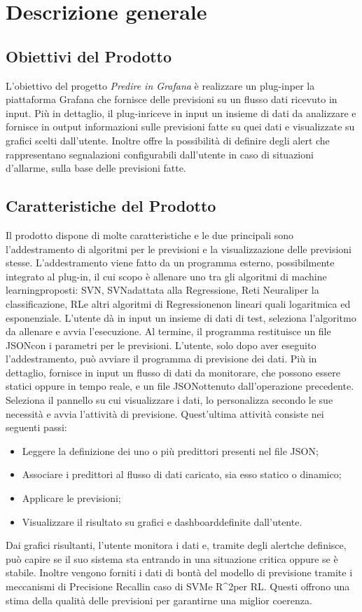 \section{Descrizione generale}
	\subsection{Obiettivi del Prodotto}
	L'obiettivo del progetto \textit{Predire in Grafana} è realizzare un plug-in\glosp per la piattaforma Grafana che fornisce delle previsioni su un flusso dati ricevuto in input.
	Più in dettaglio, il plug-in\glosp riceve in input un insieme di dati da analizzare e fornisce in output informazioni sulle previsioni fatte su quei dati e visualizzate su grafici scelti dall'utente. Inoltre offre la possibilità di definire degli alert che rappresentano segnalazioni configurabili dall'utente in caso di situazioni d'allarme, sulla base delle previsioni fatte. 
	\subsection{Caratteristiche del Prodotto}
	Il prodotto dispone di molte caratteristiche e le due principali sono l'addestramento di algoritmi per le previsioni e la visualizzazione delle previsioni stesse.
	L'addestramento viene fatto da un programma esterno, possibilmente integrato al plug-in\glo, il cui scopo è allenare uno tra gli algoritmi di machine learning\glosp proposti: SVN\glosp, SVN\glosp adattata alla Regressione\glo, Reti Neurali\glosp per la classificazione, RL\glo e altri algoritmi di Regressione\glosp non lineari quali logaritmica ed esponenziale. L'utente dà in input un insieme di dati di test, seleziona l'algoritmo da allenare e avvia l'esecuzione. Al termine, il programma restituisce un file JSON\glosp con i parametri per le previsioni.
	L'utente, solo dopo aver eseguito l'addestramento, può avviare il programma di previsione dei dati. Più in dettaglio, fornisce in input un flusso di dati da monitorare, che possono essere statici oppure in tempo reale, e un file JSON\glosp ottenuto dall'operazione precedente. Seleziona il pannello su cui visualizzare i dati, lo personalizza secondo le sue necessità e avvia l'attività di previsione. Quest'ultima attività consiste nei seguenti passi:
	\begin{itemize}
		\item Leggere la definizione dei uno o più predittori presenti nel file JSON\glosp;
		\item Associare i predittori al flusso di dati caricato, sia esso statico o dinamico;
		\item Applicare le previsioni;
		\item Visualizzare il risultato su grafici e dashboard\glosp definite dall'utente.
	\end{itemize}
	Dai grafici risultanti, l'utente monitora i dati e, tramite degli alert\glosp che definisce, può capire se il suo sistema sta entrando in una situazione critica oppure se è stabile.
	Inoltre vengono forniti i dati di bontà del modello di previsione tramite i meccanismi di Precision\glosp e Recall\glosp in caso di SVM\glosp e R^2\glosp per RL\glosp. Questi offrono una stima della qualità delle previsioni per garantirne una miglior coerenza.
